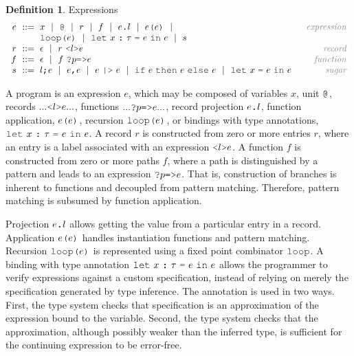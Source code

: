 \documentclass[acmsmall]{acmart}
\theoremstyle{definition}
\newtheorem{definition}{Definition}[section]
\begin{document}
\begin{definition} Expressions
  \label{def:expressions}
  \small
  \[\begin{array}[t]{r@{}l@{}r}
    \nonterm{e} 
    & 
    \is 
    \begin{array}[t]{@{}l}
      x \sep 
      \J{@} \sep
      r \sep
      f \sep 
      e\J{.}l \sep
      e\J{(}e\J{)} \sep
      \\
      \J{loop(}e\J{)} \sep
      \J{let}\ x\ \J{:}\ \tau\ \J{=}\ e\ \J{in}\ e \sep
      s
    \end{array}
    & \com{expression}
    \\
    \nonterm{r} & \is \epsilon \sep r\ \J{<}l\J{>}e 
    & \com{record}
    \\
    \nonterm{f} & \is \epsilon \sep f\ \J{?}p\J{=>}e
    & \com{function}
    \\
    \nonterm{s} 
    & 
    \is 
    \begin{array}[t]{@{}l}
      l \J{;} e \sep
      e \J{,} e \sep
      e\ \J{|>}\ e \sep
      \J{if}\ e\ \J{then}\ e\ \J{else}\ e \sep
      \J{let}\ x\ \J{=}\ e\ \J{in}\ e
    \end{array}
    & \com{sugar}
  \end{array}\]
\end{definition}

\noindent
A program is an expression $e$, which may be composed of variables $x$, unit $\J{@}$,
records $... \J{<}l\J{>} e ...$, functions $...\J{?}p \J{=>} e ...$, record
projection $e\J{.}l$, function application, $e\J{(}e\J{)}$, recursion $\J{loop(}e\J{)}$,
or bindings with type annotations, $\J{let}\ x\ \J{:}\ \tau\ \J{=}\ e\ \J{in}\ e$.
A record $r$ is constructed from zero or more entries $r$, where an entry
is a label associated with an expression $\J{<}l\J{>}e$.
A function $f$ is constructed from zero or more paths $f$, where a path is distinguished by a pattern
and leads to an expression $\J{?}p \J{=>} e$.
That is, construction of branches is inherent to functions and decoupled from pattern matching.
Therefore, pattern matching is subsumed by function application.

Projection $e\J{.}l$ allows getting the value from a particular entry in a record. 
Application $e\J{(}e\J{)}$ handles instantiation functions and pattern matching. 
Recursion $\J{loop(}e\J{)}$ is represented using a fixed point combinator $\J{loop}$.
A binding with type annotation $\J{let}\ x\ \J{:}\ \tau\ \J{=}\ e\ \J{in}\ e$ allows the programmer 
to verify expressions against a custom specification, instead of relying on merely 
the specification generated by type inference.
The annotation is used in two ways. First, the type system checks that specification is an approximation
of the expression bound to the variable. Second, the type system checks that the approximation,
although possibly weaker than the inferred type, is sufficient for the continuing expression to be error-free. 
\end{document}
